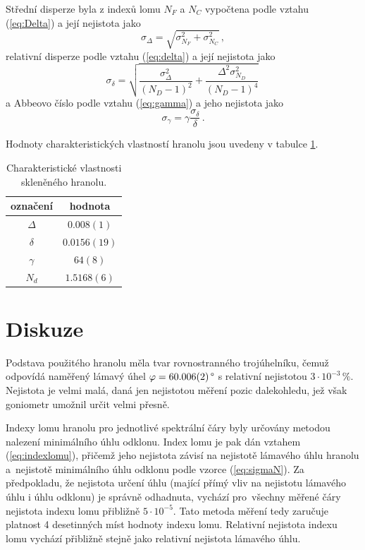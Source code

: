 \documentclass{../concepts/titul_protokol_p/prepareprotokol} %
\newcommand{\relative}[1]{
\frac{\sigma_{#1}}{#1}
}
\begin{document}
Střední disperze byla z indexů lomu $N_F$ a $N_C$ vypočtena podle vztahu
(\ref{eq:Delta}) a její nejistota jako
\begin{equation}\label{sigmaDelta}
    \sigma_{\Delta} = \sqrt{\sigma_{N_F}^2 + \sigma_{N_C}^2} \, ,
\end{equation}
relativní disperze podle vztahu (\ref{eq:delta}) a její nejistota jako
\begin{equation}\label{sigmadelta}
    \sigma_{\delta} = \sqrt{ \frac{\sigma_{\Delta}^2}
    {\left( N_D - 1 \right)^2} + \frac{\Delta^2 \sigma^2_{N_D}}{\left( N_D - 1 \right)^4} } \, 
\end{equation}
a Abbeovo číslo podle vztahu (\ref{eq:gamma}) a jeho nejistota jako
\begin{equation}\label{sigmagamma}
    \sigma_{\gamma} = \gamma \relative{\delta} \, .
\end{equation}

Hodnoty charakteristických vlastností hranolu jsou uvedeny
v tabulce \ref{tab:vlastnosti}.

\begin{table}[!htbp]
\centering
\caption{Charakteristické vlastnosti skleněného hranolu.}
\begin{tabular}{cc}
 \toprule
 označení & hodnota \\
 \midrule
 $\Delta$ & $0.008(1)$ \\
 $\delta$ & $0.0156(19)$ \\
 $\gamma$ & $64(8)$ \\
 $N_d$ & $1.5168(6)$ \\
 \bottomrule
\end{tabular}
\label{tab:vlastnosti}
\end{table}

\section{Diskuze}

Podstava použitého hranolu měla tvar rovnostranného trojúhelníku, čemuž
odpovídá naměřený lámavý úhel $\varphi = 60.006(2) \,\degree$ s relativní
nejistotou $3 \cdot 10^{-3}\, \%$. Nejistota je velmi malá, daná jen
nejistotou měření pozic dalekohledu, jež však goniometr umožnil určit
velmi přesně.

Indexy lomu hranolu pro jednotlivé spektrální čáry byly určovány metodou
nalezení minimálního úhlu odklonu. Index lomu je pak dán vztahem (\ref{eq:indexlomu}),
přičemž jeho nejistota závisí na nejistotě lámavého úhlu hranolu 
a~nejistotě minimálního úhlu odklonu podle vzorce (\ref{eq:sigmaN}).
Za předpokladu, že nejistota určení úhlu (mající přímý vliv na nejistotu
lámavého úhlu i úhlu odklonu) je správně odhadnuta, vychází 
pro~všechny měřené čáry nejistota indexu lomu přibližně $5 \cdot 10^{-5}$.
Tato metoda měření tedy zaručuje platnost 4 desetinných míst
hodnoty indexu lomu. Relativní nejistota indexu lomu vychází
přibližně stejně jako relativní nejistota lámavého úhlu.
\end{document}
